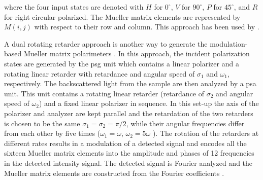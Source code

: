 \noindent where the four input states are denoted with $H$ for $0^{\circ}$, $V$ for $ 90^{\circ}$, $P$ for $45^{\circ}$, and $R$ for right circular polarized.
The Mueller matrix elements are represented by $M(i,j)$ with respect to their row and column.
This approach has been used by \cite{ghosh2009mueller,ghosh2008mueller}.

A dual rotating retarder approach is another way to generate the modulation-based Mueller matrix polarimeters \cite{ghosh2011tissue,goldstein1992mueller,azzam1978photopolarimetric,smith2002optimization}.
In this approach, the incident polarization states are generated by the \ac{psg} unit which contains a linear polarizer and a rotating linear retarder with retardance and angular speed of $\sigma_{1}$ and $\omega_{1}$, respectively.
The backscattered light from the sample are then analyzed by a \ac{psa} unit.
This unit contains a rotating linear retarder (retardance of $\sigma_{2}$ and angular speed of $\omega_{2}$) and a fixed linear polarizer in sequence.
In this set-up the axis of the polarizer and analyzer are kept parallel and the retardation of the two retarders is chosen to be the same $\sigma_{1} = \sigma_{2}= \pi/2$, while their angular frequencies differ from each other by five times ($\omega_{1} = \omega$, $\omega_{2} = 5\omega$ ).
The rotation of the retarders at different rates results in a modulation of a detected signal and encodes all the sixteen Mueller matrix elements into the amplitude and phases of 12 frequencies in the detected intensity signal.
The detected signal is Fourier analyzed and the Mueller matrix elements are constructed from the Fourier coefficients \cite{ghosh2011tissue,goldstein1992mueller,azzam1978photopolarimetric,smith2002optimization}. 


